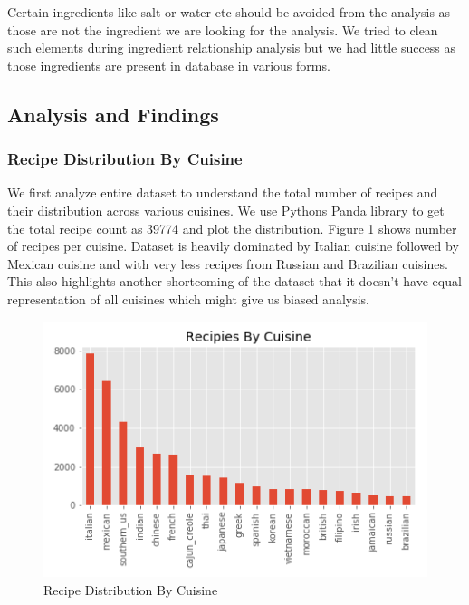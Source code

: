 \documentclass[sigconf]{acmart}
\begin{document}
Certain ingredients like salt or water etc should be avoided from the analysis as those are not the ingredient we are looking for the analysis. We tried to clean such elements during ingredient relationship analysis but we had little success as those ingredients are present in database in various forms.  

\subsection{Analysis and Findings}

\subsubsection{Recipe Distribution By Cuisine}
We first analyze entire dataset to understand the total number of recipes and their distribution across various cuisines. We use Pythons Panda library to get the total recipe count as 39774 and plot the distribution. Figure \ref{f:Number_of_recipes_by_cuisine} shows number of recipes per cuisine. Dataset is heavily dominated by Italian cuisine followed by Mexican cuisine and with very less recipes from Russian and Brazilian cuisines. This also highlights another shortcoming of the dataset that it doesn't have equal representation of all cuisines which might give us biased analysis.
\begin{figure}[!ht]
  \centering\includegraphics[width=\columnwidth]{images/Number_of_recipes_by_cuisine.png}
  \caption{Recipe Distribution By Cuisine }\label{f:Number_of_recipes_by_cuisine}
\end{figure}
\end{document}
